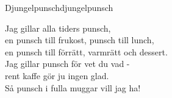 \begin{song}{Djungelpunsch}{djungelpunsch}
\begin{vers}
Jag gillar alla tiders punsch,\\
en punsch till frukost, punsch till lunch,\\
en punsch till förrätt, varmrätt och dessert.\\
Jag gillar punsch för vet du vad -\\
rent kaffe gör ju ingen glad.\\
Så punsch i fulla muggar vill jag ha!\\
\end{vers}
\end{song}
